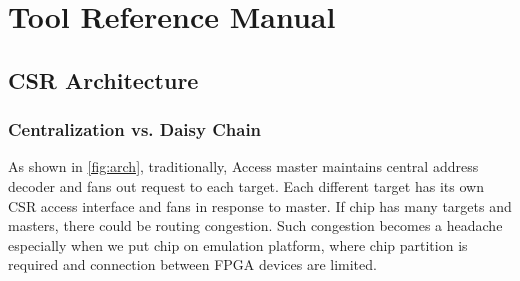 \documentclass[10pt,oneside]{book}
\begin{document}
\part{Tool Reference Manual}\label{part:man}
\chapter{CSR Architecture}\label{sec:chapter arch}
\section{Centralization vs. Daisy Chain}
As shown in \autoref{fig:arch}, traditionally, Access master maintains
central address decoder and fans out request to each
\gls{target}. Each different \gls{target} has its own CSR access
interface and fans in response to master. If chip has many \gls{target}s
and masters, there could be routing congestion. Such congestion becomes a 
headache especially when we put chip 
on emulation platform, where chip partition is required and connection between
FPGA devices are limited.
\end{document}
